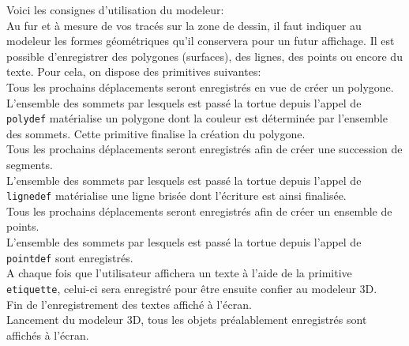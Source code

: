 Voici les consignes d'utilisation du modeleur:\\
Au fur et à mesure de vos tracés sur la zone de dessin, il faut indiquer au modeleur les formes géométriques qu'il conservera pour un futur affichage. Il est possible d'enregistrer des polygones (surfaces), des lignes, des points ou encore du texte. Pour cela, on dispose des primitives suivantes:\\
Tous les prochains déplacements seront enregistrés en vue de créer un polygone. \\
L'ensemble des sommets par lesquels est passé la tortue depuis l'appel de \texttt{polydef} matérialise un polygone dont la couleur est déterminée par l'ensemble des sommets. Cette primitive finalise la création du polygone. \\
Tous les prochains déplacements seront enregistrés afin de créer une succession de segments. \\
L'ensemble des sommets par lesquels est passé la tortue depuis l'appel de \texttt{lignedef} matérialise une ligne brisée dont l'écriture est ainsi finalisée. \\
Tous les prochains déplacements seront enregistrés afin de créer un ensemble de points. \\
L'ensemble des sommets par lesquels est passé la tortue depuis l'appel de \texttt{pointdef} sont enregistrés.\\
A chaque fois que l'utilisateur affichera un texte à l'aide de la primitive \texttt{etiquette}, celui-ci sera enregistré pour être ensuite confier au modeleur 3D.\\
Fin de l'enregistrement des textes affiché à l'écran.\\
Lancement du modeleur 3D, tous les objets préalablement enregistrés sont affichés à l'écran.
